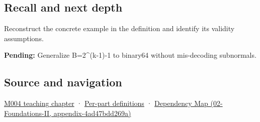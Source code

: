 \subsection{Recall and next depth}\label{appendix-2fae058c82e1-recall-and-next-depth}

Reconstruct the concrete example in the definition and identify its validity assumptions.

\textbf{Pending:} Generalize B=2\^{}(k-1)-1 to binary64 without mis-decoding subnormals.

\subsection{Source and navigation}\label{appendix-2fae058c82e1-source-and-navigation}

\hyperref[01-foundations-i-ch001-a-stretching-ruler-for-real-valued-quantities]{M004 teaching chapter} · \hyperref[appendix-fd090d982a15-m004---parts-61-76]{Per-part definitions} · \href{../02-Foundations-II/main.pdf\#nameddest=appendix-4ad47bdd269a}{Dependency Map (02-Foundations-II, appendix-4ad47bdd269a)}
